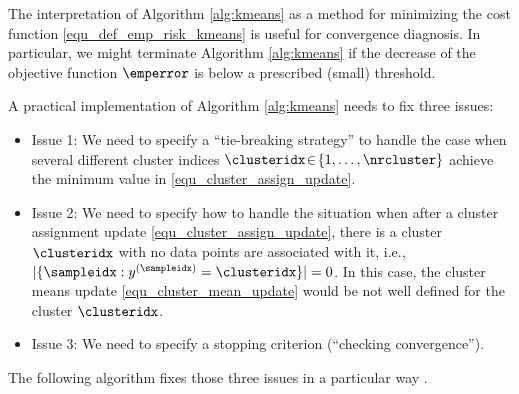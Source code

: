 \documentclass[12pt]{report}
\begin{document}
The interpretation of Algorithm \ref{alg:kmeans} as a method for minimizing the cost function \eqref{equ_def_emp_risk_kmeans} is 
useful for convergence diagnosis. In particular, we might terminate Algorithm \ref{alg:kmeans} if the decrease of 
the objective function $ \emperror$ is below a prescribed (small) threshold. 
 
A practical implementation of Algorithm \ref{alg:kmeans} needs to fix three issues: 
\begin{itemize} 
\item Issue 1: We need to specify a ``tie-breaking strategy'' to handle the case when several 
different cluster indices $\clusteridx\!\in\!\{1,\ldots,\nrcluster\}$ achieve the minimum value in \eqref{equ_cluster_assign_update}. 
\item Issue 2: We need to specify how to handle the situation when after a cluster assignment 
update  \eqref{equ_cluster_assign_update}, there is a cluster $\clusteridx$ with no data points are 
associated with it, i.e., $|\{ \sampleidx: y^{(\sampleidx)} = \clusteridx \}|=0$. In this case, the cluster 
means update \eqref{equ_cluster_mean_update} would be not well defined for the cluster $\clusteridx$. 
\item Issue 3: We need to specify a stopping criterion (``checking convergence''). 
\end{itemize}
The following algorithm fixes those three issues in a particular way \cite{Gray1980}.  
\end{document}

